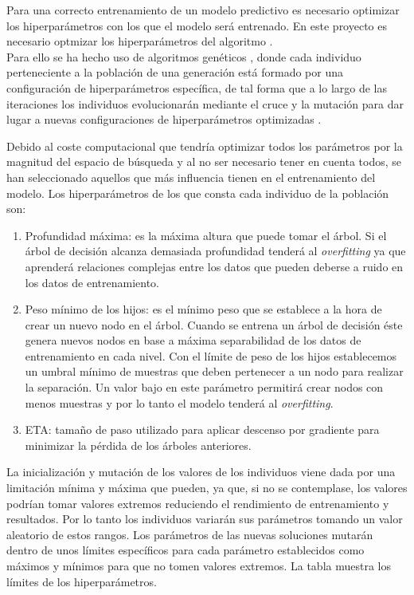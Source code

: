         Para una correcto entrenamiento de un modelo predictivo es necesario optimizar los hiperparámetros con los que el modelo será entrenado. En este proyecto es necesario optmizar los hiperparámetros del algoritmo .\\

        Para ello se ha hecho uso de algoritmos genéticos \cite{GAXGBoostCode}, donde cada individuo perteneciente a la población de una generación está formado por una configuración de hiperparámetros específica, de tal forma que a lo largo de las iteraciones los individuos evolucionarán mediante el cruce y la mutación para dar lugar a nuevas configuraciones de hiperparámetros optimizadas \cite{GAXGBoostPaper}.

        Debido al coste computacional que tendría optimizar todos los parámetros por la magnitud del espacio de búsqueda y al no ser necesario tener en cuenta todos, se han seleccionado aquellos que más influencia tienen en el entrenamiento del modelo. Los hiperparámetros de los que consta cada individuo de la población son:

        \begin{enumerate}

            \item Profundidad máxima: es la máxima altura que puede tomar el árbol. Si el árbol de decisión alcanza demasiada profundidad tenderá al \textit{overfitting} ya que aprenderá relaciones complejas entre los datos que pueden deberse a ruido en los datos de entrenamiento.

            \item Peso mínimo de los hijos: es el mínimo peso que se establece a la hora de crear un nuevo nodo en el árbol. Cuando se entrena un árbol de decisión éste genera nuevos nodos en base a máxima separabilidad de los datos de entrenamiento en cada nivel. Con el límite de peso de los hijos establecemos un umbral mínimo de muestras que deben pertenecer a un nodo para realizar la separación. Un valor bajo en este parámetro permitirá crear nodos con menos muestras y por lo tanto el modelo tenderá al \textit{overfitting}.

            \item ETA: tamaño de paso utilizado para aplicar descenso por gradiente para minimizar la pérdida de los árboles anteriores.

        \end{enumerate}

        La inicialización y mutación de los valores de los individuos viene dada por una limitación mínima y máxima que pueden, ya que, si no se contemplase, los valores podrían tomar valores extremos reduciendo el rendimiento de entrenamiento y resultados. Por lo tanto los individuos variarán sus parámetros tomando un valor aleatorio de estos rangos.  Los parámetros de las nuevas soluciones mutarán dentro de unos límites específicos para cada parámetro establecidos como máximos y mínimos para que no tomen valores extremos. La tabla \cite{InitAndMutationLimitsHyperparamsTable} muestra los límites de los hiperparámetros.

